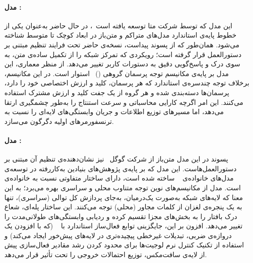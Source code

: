 \paragraph{مدل :} این مدل که توسط شرکت متا توسعه یافته است~\cite{grattafiori2024llama3}، در حال حاضر به‌عنوان یکی از خطوط پایه‌ی استاندارد مدل‌های متراکم و متن‌باز در ابعاد کوچک تا متوسط شناخته می‌شود. همان‌طور که از پسوند  پیداست، نسخه‌ی حاضر تحت فرایند تنظیم مبتنی بر دستورالعمل قرار گرفته است؛ رویکردی که تمرکز شبکه را از تکمیل ساده‌ی متن، به سوی درک و پاسخ‌گویی دقیق به دستورات کاربر تغییر می‌دهد. از منظر معماری، این مدل بر پایه‌ی مکانیسم توجه پرسمان گروهی ()~\cite{ainslie2023gqa} استوار است. در این مکانیسم، برخلاف توجه چندسره‌ی استاندارد که هر پرسمان، کلید و ارزش اختصاصی خود را دارد، پرسمان‌ها دسته‌بندی شده و هر گروه از یک جفت کلید و ارزش مشترک استفاده می‌کنند. این امر اگرچه کارایی محاسباتی و سرعت استنتاج را به‌طور چشمگیری ارتقا می‌دهد، اما مسیرهای توزیع اطلاعات و جریان وابستگی‌های لایه‌ای را نسبت به ترنسفورمرهای اولیه دگرگون می‌سازد.

\paragraph{مدل :} پسوند  در این مدل متن‌باز از شرکت گوگل~\cite{gemmateam2024gemma2} نیز نشان‌دهنده‌ی تنظیم آن مبتنی بر دستورالعمل‌هاست. این مدل که بر پایه‌ی پژوهش‌های بنیادین به‌کاررفته در توسعه‌ی مدل‌های خانواده‌ی ~\cite{comanici2025gemini25} ساخته شده است، دارای ساختار متفاوتی نسبت به خانواده‌ی  است. مدل  از مکانیسم‌های نوین توجه متناوب محلی و سراسری بهره می‌برد؛ به این معنا که لایه‌های شبکه به‌صورت یک‌درمیان، به‌جای پردازش کل توالی (سراسری)، تنها به یک پنجره‌ی لغزان از کلمات مجاور (محلی) توجه می‌کنند. این ساختار پله‌ای، شعاع درک بافتار را به بخش‌های مجزا تقسیم کرده و ردیابی وابستگی‌های طولانی‌مدت را تغییر می‌دهد. افزون بر این، جایگزینی توابع فعال‌ساز استاندارد با ~\cite{shazeer2020glu} (که با افزودن یک دروازه‌ی ضربی، تبدیلات غیرخطی پیچیده‌تری در لایه‌های پیش‌خور ایجاد می‌کند) و استفاده از تکنیک کنترل نرم لوجیت‌ها برای محدود کردن رشد مقادیر فعال‌سازی پیش از لایه‌ی سافت‌مکس، توزیع احتمالات خروجی را تحت تأثیر قرار می‌دهد.

